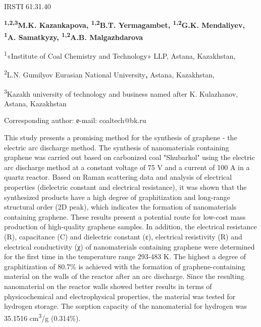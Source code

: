 \newpage
IRSTI 61.31.40


\begin{center}
{\bfseries \textsuperscript{1,2,3}M.K. Kazankapova, \textsuperscript{1,2}B.T. Yermagambet, \textsuperscript{1,2}G.K. Mendaliyev, \textsuperscript{1}A. Samatkyzy, \textsuperscript{1,2}A.B. Malgazhdarova}

\textsuperscript{1}«Institute of Coal Chemistry and Technology» LLP,
Astana, Kazakhstan,

\textsuperscript{2}L.N. Gumilyov Eurasian National University{\bfseries ,}
Astana, Kazakhstan,

\textsuperscript{3}Kazakh university of technology and business named
after K. Kulazhanov, Astana, Kazakhstan

Corresponding author: е-mail: coaltech@bk.ru
\end{center}

This study presents a promising method for the synthesis of graphene -
the electric arc discharge method. The synthesis of nanomaterials
containing graphene was carried out based on carbonized coal "Shubarkol"
using the electric arc discharge method at a constant voltage of 75 V
and a current of 100 A in a quartz reactor. Based on Raman scattering
data and analysis of electrical properties (dielectric constant and
electrical resistance), it was shown that the synthesized products have
a high degree of graphitization and long-range structural order (2D
peak), which indicates the formation of nanomaterials containing
graphene. These results present a potential route for low-cost mass
production of high-quality graphene samples. In addition, the electrical
resistance (R), capacitance (C) and dielectric constant (ε), electrical
resistivity (R) and electrical conductivity (χ) of nanomaterials
containing graphene were determined for the first time in the
temperature range 293-483 K. The highest a degree of graphitization of
80.7\% is achieved with the formation of graphene-containing material on
the walls of the reactor after an arc discharge. Since the resulting
nanomaterial on the reactor walls showed better results in terms of
physicochemical and electrophysical properties, the material was tested
for hydrogen storage. The sorption capacity of the nanomaterial for
hydrogen was 35.1516 cm\textsuperscript{3}/g (0.314\%).

